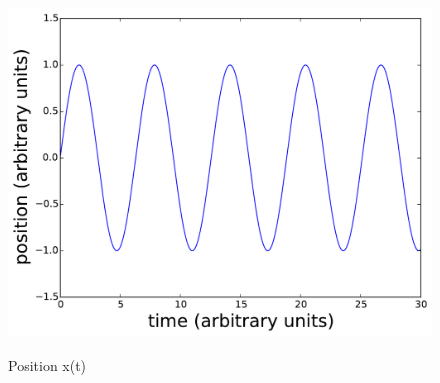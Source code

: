 \begin{figure}
{            \includegraphics[scale=0.24]{fig/ho/ho_x(t)_euler_symplectic.pdf}
            \label{fig:ho_x(t)_euler_symplectic}
        }
        \caption{Position x(t)}
    \label{fig:ho_x(t)_euler}
\end{figure}

